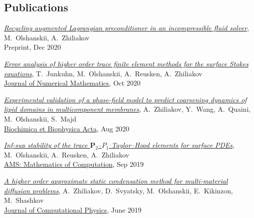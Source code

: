 \documentclass[a4paper,12pt]{article}
\begin{document}
	\subsection*{Publications}
	
	\begin{etaremune}[topsep=0pt]
		\item \textit{\href{https://arxiv.org/abs/2012.10073}{Recycling augmented Lagrangian preconditioner in an incompressible fluid solver}}, M.~Olshanskii, A.~Zhiliakov\\
		Preprint, Dec 2020
		\item \textit{\href{https://arxiv.org/abs/2003.06972}{Error analysis of higher order trace finite element methods for the surface Stokes equations}}, T.~Junkuhn, M.~Olshanskii, A.~Reusken, A.~Zhiliakov\\
		\href{https://doi.org/10.1515/jnma-2020-0017}{Journal of Numerical Mathematics}, Oct 2020		
		\item \textit{\href{https://arxiv.org/abs/2006.14125}{Experimental validation of a phase-field model to predict coarsening dynamics of lipid domains in multicomponent membranes}}, A.~Zhiliakov, Y.~Wang, A.~Quaini, M.~Olshanskii, S.~Majd\\
		\href{https://doi.org/10.1016/j.bbamem.2020.183446}{Biochimica et Biophysica Acta}, Aug 2020
		\item \textit{\href{https://arxiv.org/abs/1909.02990}{Inf-sup stability of the trace $\mathbf P_2$--$P_1$ Taylor--Hood elements for surface PDEs}}, M.~Olshanskii, A.~Reusken, A.~Zhiliakov\\ \href{https://doi.org/10.1090/mcom/3551}{AMS: Mathematics of Computation}, Sep 2019 
		\item \textit{\href{https://www.researchgate.net/publication/333900759_A_higher_order_approximate_static_condensation_method_for_multi-material_diffusion_problems}{A higher order approximate static condensation method for multi-material diffusion problems}}, A.~Zhiliakov, D.~Svyatsky, M.~Olshanskii, E.~Kikinzon, M.~Shashkov\\ \href{https://doi.org/10.1016/j.jcp.2019.06.044}{Journal of Computational Physics}, June 2019 

\end{etaremune}
\end{document}
